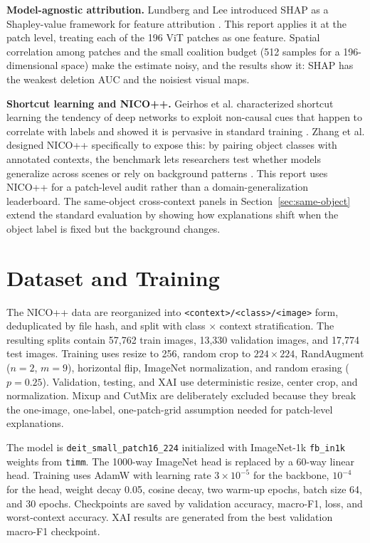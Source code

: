 \documentclass[10pt]{article}
\begin{document}
\textbf{Model-agnostic attribution.} Lundberg and Lee introduced SHAP as a Shapley-value framework for feature attribution \cite{lundberg2017unified}. This report applies it at the patch level, treating each of the 196 ViT patches as one feature. Spatial correlation among patches and the small coalition budget (512 samples for a 196-dimensional space) make the estimate noisy, and the results show it: SHAP has the weakest deletion AUC and the noisiest visual maps.

\textbf{Shortcut learning and NICO++.} Geirhos et al. characterized shortcut learning the tendency of deep networks to exploit non-causal cues that happen to correlate with labels and showed it is pervasive in standard training \cite{geirhos2020shortcut}. Zhang et al. designed NICO++ specifically to expose this: by pairing object classes with annotated contexts, the benchmark lets researchers test whether models generalize across scenes or rely on background patterns \cite{zhang2023nico}. This report uses NICO++ for a patch-level audit rather than a domain-generalization leaderboard. The same-object cross-context panels in Section~\ref{sec:same-object} extend the standard evaluation by showing how explanations shift when the object label is fixed but the background changes.

\section{Dataset and Training}
The NICO++ data are reorganized into \texttt{<context>/<class>/<image>} form, deduplicated by file hash, and split with class $\times$ context stratification. The resulting splits contain 57,762 train images, 13,330 validation images, and 17,774 test images. Training uses resize to 256, random crop to $224\times224$, RandAugment ($n=2$, $m=9$), horizontal flip, ImageNet normalization, and random erasing ($p=0.25$). Validation, testing, and XAI use deterministic resize, center crop, and normalization. Mixup and CutMix are deliberately excluded because they break the one-image, one-label, one-patch-grid assumption needed for patch-level explanations.

The model is \texttt{deit\_small\_patch16\_224} initialized with ImageNet-1k \texttt{fb\_in1k} weights from \texttt{timm}. The 1000-way ImageNet head is replaced by a 60-way linear head. Training uses AdamW with learning rate $3\times10^{-5}$ for the backbone, $10^{-4}$ for the head, weight decay 0.05, cosine decay, two warm-up epochs, batch size 64, and 30 epochs. Checkpoints are saved by validation accuracy, macro-F1, loss, and worst-context accuracy. XAI results are generated from the best validation macro-F1 checkpoint.
\end{document}
